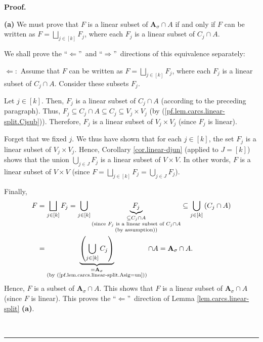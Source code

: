 \documentclass[numbers=enddot,12pt,final,onecolumn,notitlepage]{scrartcl}%
\numberwithin{exer}{section}
\theoremstyle{definition}
\newenvironment{proof}[1][Proof]{\noindent\textbf{#1.} }{\ \rule{0.5em}{0.5em}}
\let\cupnonlimits\bigcup
\let\sqcupnonlimits\bigsqcup
\renewcommand{\bigcup}{\cupnonlimits\limits}
\renewcommand{\bigsqcup}{\sqcupnonlimits\limits}
\newenvironment{verlong}{}{}
\begin{document}
\begin{verlong}
\begin{proof}
\medskip

\textbf{(a)} We must prove that $F$ is a linear subset of $\mathbf{A}_{\sigma
}\cap A$ if and only if $F$ can be written as $F=\bigsqcup_{j\in\left[
k\right]  }F_{j}$, where each $F_{j}$ is a linear subset of $C_{j}\cap A$.

We shall prove the \textquotedblleft$\Longleftarrow$\textquotedblright\ and
\textquotedblleft$\Longrightarrow$\textquotedblright\ directions of this
equivalence separately:

$\Longleftarrow:$ Assume that $F$ can be written as $F=\bigsqcup_{j\in\left[
k\right]  }F_{j}$, where each $F_{j}$ is a linear subset of $C_{j}\cap A$.
Consider these subsets $F_{j}$.

Let $j\in\left[  k\right]  $. Then, $F_{j}$ is a linear subset of $C_{j}\cap
A$ (according to the preceding paragraph). Thus, $F_{j}\subseteq C_{j}\cap
A\subseteq C_{j}\subseteq V_{j}\times V_{j}$ (by
(\ref{pf.lem.carcs.linear-split.Cjsub})). Therefore, $F_{j}$ is a linear
subset of $V_{j}\times V_{j}$ (since $F_{j}$ is linear).

Forget that we fixed $j$. We thus have shown that for each $j\in\left[
k\right]  $, the set $F_{j}$ is a linear subset of $V_{j}\times V_{j}$. Hence,
Corollary \ref{cor.linear-djun} (applied to $J=\left[  k\right]  $) shows that
the union $\bigcup_{j\in J}F_{j}$ is a linear subset of $V\times V$. In other
words, $F$ is a linear subset of $V\times V$ (since $F=\bigsqcup_{j\in\left[
k\right]  }F_{j}=\bigcup_{j\in J}F_{j}$).

Finally,%
\begin{align*}
F  &  =\bigsqcup_{j\in\left[  k\right]  }F_{j}=\bigcup_{j\in\left[  k\right]
}\underbrace{F_{j}}_{\substack{\subseteq C_{j}\cap A\\\text{(since }%
F_{j}\text{ is a linear subset of }C_{j}\cap A\\\text{(by assumption))}%
}}\subseteq\bigcup_{j\in\left[  k\right]  }\left(  C_{j}\cap A\right) \\
&  =\underbrace{\left(  \bigcup_{j\in\left[  k\right]  }C_{j}\right)
}_{\substack{=\mathbf{A}_{\sigma}\\\text{(by
(\ref{pf.lem.carcs.linear-split.Asig=un}))}}}\cap A=\mathbf{A}_{\sigma}\cap A.
\end{align*}
Hence, $F$ is a subset of $\mathbf{A}_{\sigma}\cap A$. This shows that $F$ is
a linear subset of $\mathbf{A}_{\sigma}\cap A$ (since $F$ is linear). This
proves the \textquotedblleft$\Longleftarrow$\textquotedblright\ direction of
Lemma \ref{lem.carcs.linear-split} \textbf{(a)}.


\end{proof}
\end{verlong}
\end{document}
